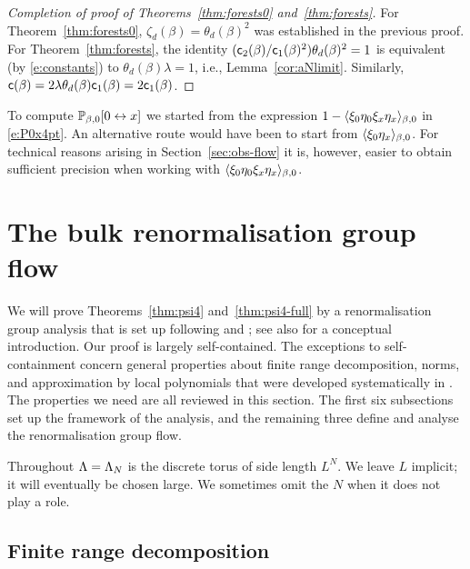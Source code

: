 \documentclass[11pt]{amsart}
\numberwithin{equation}{section}
\numberwithin{theorem}{section}
\newcommand{\conn}{\leftrightarrow}
\newcommand{\1}{{\bf 1}}
\newcommand{\consta}{{\sf c}_1}
\newcommand{\constb}{{\sf c}_2}
\newcommand{\consto}{{\sf c}}
\newcommand{\clambda}{\lambda}
\begin{document}
\begin{proof}[Completion of proof of Theorems~\ref{thm:forests0} and~\ref{thm:forests}]
    For Theorem~\ref{thm:forests0}, $\zeta_d(\beta) =
    \theta_d(\beta)^2$ was established in the 
    previous proof. For Theorem~\ref{thm:forests}, the identity
    $(\constb(\beta)/\consta(\beta)^{2})\theta_{d}(\beta)^{2}=1$ is
    equivalent (by \eqref{e:constants}) to $\theta_{d}(\beta)\lambda=1$, i.e.,
    Lemma~\ref{cor:aNlimit}. Similarly,
    $\consto(\beta)=2\clambda\theta_{d}(\beta) \consta(\beta) = 2\consta(\beta)$.
\end{proof}
  
\begin{remark}
  To compute $\P_{\beta,0}[0\conn x]$ we started from the expression
  $1-\langle \xi_0\eta_0\xi_x\eta_x \rangle_{\beta,0}$ in \eqref{e:P0x4pt}.  An
  alternative route would have been to start from
  $\langle \xi_0\eta_x \rangle_{\beta,0}$.  For technical reasons arising in
  Section~\ref{sec:obs-flow} it is, however, easier to obtain sufficient
  precision when working with $\langle \xi_0\eta_0\xi_x\eta_x \rangle_{\beta,0}$.
\end{remark}


\section{The bulk renormalisation group flow}
\label{sec:bulk}

We will prove Theorems~\ref{thm:psi4} and~\ref{thm:psi4-full} by a renormalisation group
analysis that is set up following \cite{MR2523458,MR3332942} and
\cite{MR3345374,MR3339164}; see also \cite{MR3969983} for a conceptual
introduction.  Our proof is largely self-contained.
The exceptions to self-containment
concern general properties about finite range decomposition, norms, and approximation
by local polynomials that were developed systematically in
\cite{MR3129804,MR3332938,MR3332939}. The properties we need
are all reviewed in this section. The first six subsections set up
the framework of the analysis, and the remaining three define and
analyse the renormalisation group flow.

Throughout $\Lambda=\Lambda_N$ is the discrete torus of side length $L^N$.
We leave $L$ implicit; it will eventually be chosen large. We
sometimes omit the $N$ when it does not play a role.

\subsection{Finite range decomposition}
\label{sec:frd}
\end{document}
